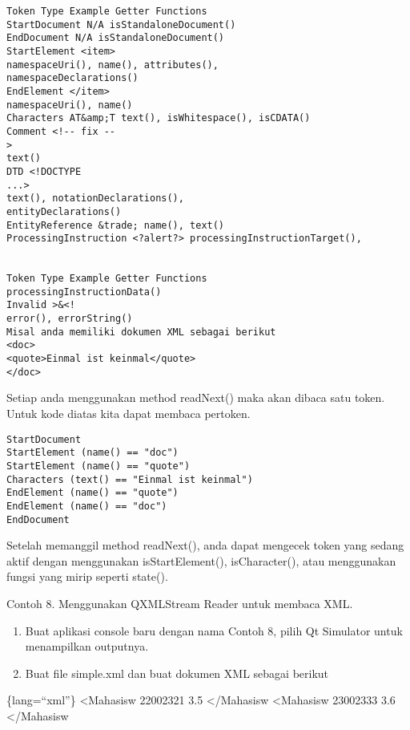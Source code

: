 \begin{verbatim}
Token Type Example Getter Functions
StartDocument N/A isStandaloneDocument()
EndDocument N/A isStandaloneDocument()
StartElement <item>
namespaceUri(), name(), attributes(),
namespaceDeclarations()
EndElement </item>
namespaceUri(), name()
Characters AT&amp;T text(), isWhitespace(), isCDATA()
Comment <!-- fix --
>
text()
DTD <!DOCTYPE
...>
text(), notationDeclarations(),
entityDeclarations()
EntityReference &trade; name(), text()
ProcessingInstruction <?alert?> processingInstructionTarget(),


Token Type Example Getter Functions
processingInstructionData()
Invalid >&<!
error(), errorString()
Misal anda memiliki dokumen XML sebagai berikut
<doc>
<quote>Einmal ist keinmal</quote>
</doc>
\end{verbatim}

Setiap anda menggunakan method readNext() maka akan dibaca satu token.
Untuk kode diatas kita dapat membaca pertoken.

\begin{verbatim}
StartDocument
StartElement (name() == "doc")
StartElement (name() == "quote")
Characters (text() == "Einmal ist keinmal")
EndElement (name() == "quote")
EndElement (name() == "doc")
EndDocument
\end{verbatim}

Setelah memanggil method readNext(), anda dapat mengecek token yang
sedang aktif dengan menggunakan isStartElement(), isCharacter(), atau
menggunakan fungsi yang mirip seperti state().

Contoh 8. Menggunakan QXMLStream Reader untuk membaca XML.

\begin{enumerate}
\def\labelenumi{\arabic{enumi}.}
\tightlist
\item
  Buat aplikasi console baru dengan nama Contoh 8, pilih Qt Simulator
  untuk menampilkan outputnya.
\item
  Buat file simple.xml dan buat dokumen XML sebagai berikut
\end{enumerate}

\{lang=``xml''\} \textless{}Mahasisw 22002321 3.5 \textless{}/Mahasisw
\textless{}Mahasisw 23002333 3.6 \textless{}/Mahasisw

